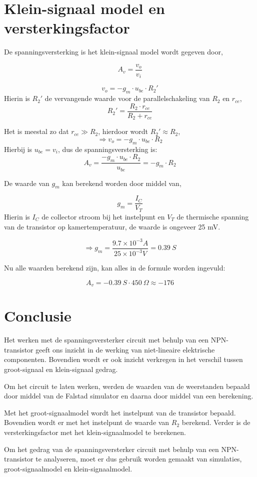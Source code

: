 \documentclass{article}
\begin{document}
\section*{Klein-signaal model en versterkingsfactor}

De spanningsversterking is het klein-signaal model wordt gegeven door,

\begin{equation}
A_v=\frac{v_o}{v_i}
\end{equation}

\begin{equation}
v_o=-g_m\cdot u_{be}\cdot R_2'
\end{equation}
Hierin is $R_2'$ de vervangende waarde voor de parallelschakeling van $R_2$ en $r_{ce}$,
$$R_2'=\frac{R_2\cdot r_{ce}}{R_2+r_{ce}}$$

\noindent Het is meestal zo dat $r_{ce}\gg R_2$, hierdoor wordt $R_2'\approx R_2$,
$$\Rightarrow v_o=-g_m\cdot u_{be}\cdot R_2$$
Hierbij is $u_{be}=v_i$, dus de spanningsversterking is:
$$A_v=\frac{-g_m\cdot u_{be}\cdot R_2}{u_{be}}=-g_m\cdot R_2$$

\noindent De waarde van $g_m$ kan berekend worden door middel van,

\begin{equation}
g_m=\frac{I_C}{V_T}
\end{equation}
Hierin is $I_C$ de collector stroom bij het instelpunt en $V_T$ de thermische spanning van de transistor op kamertemperatuur, de waarde is ongeveer 25 mV.

$$\Rightarrow g_m=\frac{9.7\times 10^{-3}A}{25\times 10^{-3}V}= 0.39 \: S$$

Nu alle waarden berekend zijn, kan alles in de formule worden ingevuld:

$$A_v= -0.39 \: S\cdot 450 \: \Omega\approx -176 $$

\section*{Conclusie}
Het werken met de spanningsversterker circuit met behulp van een NPN-transistor geeft ons inzicht in de werking van niet-lineaire elektrische componenten. Bovendien wordt er ook inzicht verkregen in het verschil tussen groot-signaal en klein-signaal gedrag.

Om het circuit te laten werken, werden de waarden van de weerstanden bepaald door middel van de Falstad simulator en daarna door middel van een berekening.

Met het groot-signaalmodel wordt het instelpunt van de transistor bepaald. Bovendien wordt er met het instelpunt de waarde van $R_2$ berekend. Verder is de versterkingsfactor met het klein-signaalmodel te berekenen. 

Om het gedrag van de spanningsversterker circuit met behulp van een NPN-transistor te analyseren, moet er dus gebruik worden gemaakt van simulaties, groot-signaalmodel en klein-signaalmodel. 
\end{document}
